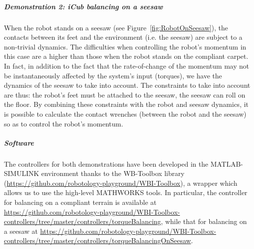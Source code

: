 \subparagraph*{Demonstration 2: iCub balancing on a seesaw}
When the robot stands on a seesaw (see Figure~\ref{fig:RobotOnSeesaw}), the contacts between its feet and the environment (i.e. the seesaw) are subject to a non-trivial dynamics.
 The difficulties when controlling the robot's momentum in this case are a higher than those when the robot stands on the compliant carpet. In fact, in addition to the fact that  the rate-of-change of the momentum may not be instantaneously affected by the system's input (torques), we have the dynamics of the seesaw to take into account. The constraints to take into account are thus: the robot's feet must be attached to the seesaw, the seesaw can roll on the floor. By combining these constraints with the robot and seesaw dynamics, it is possible to calculate the contact wrenches (between the robot and the seesaw) so as to control the robot's momentum.
 
\begin{figure}[t!]
\end{figure}

\subparagraph*{Software}
The controllers for both demonstrations have been developed in the MATLAB-SIMULINK environment thanks to the WB-Toolbox library (\url{https://github.com/robotology-playground/WBI-Toolbox}), a wrapper which allows us to use the high-level MATHWORKS tools. In particular, the controller for balancing on a compliant terrain is available at \url{https://github.com/robotology-playground/WBI-Toolbox-controllers/tree/master/controllers/torqueBalancing}, while that for balancing on a seesaw at 
\url{https://github.com/robotology-playground/WBI-Toolbox-controllers/tree/master/controllers/torqueBalancingOnSeesaw}.

